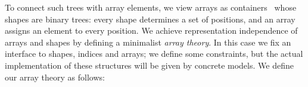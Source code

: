 To connect such trees with array elements, we view arrays as
containers~\citep{containers} whose shapes are binary trees: every shape
determines a set of positions, and an array assigns an element to every
position.  We achieve representation independence
of arrays and shapes by defining a minimalist \emph{array theory}.  In this case we fix
an interface to shapes, indices and arrays; we define some constraints,
but the actual implementation of these structures will be given
by concrete models.  We define our array theory as follows:
\begin{AgdaSuppressSpace}
\begin{mathpar}
\end{mathpar}
\end{AgdaSuppressSpace}
